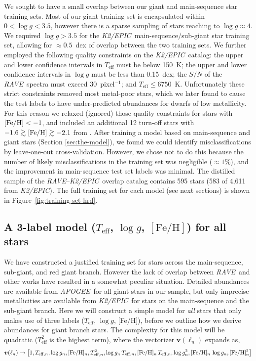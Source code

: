 \documentclass[preprint,trackchanges]{aastex}
\newcommand{\acronym}[1]{{\small{#1}}}
\newcommand{\project}[1]{\textsl{#1}}
\newcommand{\rave}{\project{\acronym{RAVE}}}
\newcommand{\apogee}{\project{\acronym{APOGEE}}}
\newcommand{\epic}{\project{K2/EPIC}}
\newcommand{\teff}{T_{\mathrm{eff}}}
\newcommand{\logg}{\log g}
\newcommand{\feh}{[\mathrm{Fe/H}]}
\newcommand{\Dvector}[1]{\boldsymbol{#1}}
\newcommand{\vecv}{\Dvector{v}}
\begin{document}
We sought to have a small overlap between our giant and main-sequence star training
sets.  Most of our giant training set is encapsulated within $0 < \logg < 3.5$, 
however there is a sparse sampling of stars reaching to $\logg \approx 4$.  We
required $\logg > 3.5$ for the \epic\ main-sequence/sub-giant star training set,
allowing for $\approx0.5$~dex of overlap between the two training sets.  We further
employed the following quality constraints on the \epic\ catalog: the upper and lower 
confidence intervals in $\teff$ must be below 150~K; the upper and lower confidence 
intervals in $\logg$ must be less than 0.15~dex; the $S/N$ of the \rave\ spectra must
exceed 30~pixel$^{-1}$; and $\teff \leqslant 6750$~K.  Unfortunately these strict 
constraints removed most metal-poor stars, which we later found to cause the test 
labels to have under-predicted abundances for dwarfs of low metallicity.  For this 
reason we relaxed (ignored) those quality constraints for stars with 
$[{\rm Fe/H}] < -1$, and included an additional 12 turn-off stars with 
$-1.6 \gtrsim [{\rm Fe/H}] \gtrsim -2.1$ from \citet{Ruchti_2011}.  After training
a model based on main-sequence and giant stars (Section \ref{sec:the-model}), we found 
we could identify misclassifications by leave-one-out cross-validation.  However, we 
chose not to do this because the number of likely misclassifications in the training
set was negligible ($\approx1$\%), and the improvement in main-sequence test set labels
was minimal.  The distilled sample of the \rave--\epic\ overlap catalog contains 595 
stars (583 of 4,611 from \epic).  The full training set for each model (see next 
sections) is shown in Figure~\ref{fig:training-set-hrd}.


\subsection{A 3-label model ($\teff$, $\logg$, $\feh$) for all stars}
\label{sec:a-simple-model}


We have constructed a justified training set for stars across the main-sequence, sub-giant,
and red giant branch.  However the lack of overlap between \rave\ and other works have
resulted in a somewhat peculiar situation.  Detailed abundances are available from \apogee\
for all giant stars in our sample, but only imprecise metallicities are available from
\epic\ for stars on the main-sequence and the sub-giant branch.  Here we will construct 
a simple model for \emph{all} stars that only makes use of three labels ($\teff$, $\logg$, 
[Fe/H]), before we outline how we derive abundances for giant branch stars.  The complexity
for this model will be quadratic ($\teff^2$ is the highest term), where the vectorizer 
$\vecv(\ell_n)$ expands as,
\begin{eqnarray}\label{eq:vectorizer-three-label}
\vecv(\ell_n) \rightarrow \left[1, T_{{\rm eff},n}, \logg_n, [{\rm Fe/H}]_n, T_{{\rm eff},n}^2, \logg_n\,T_{{\rm eff},n}, \feh_n\,T_{{\rm eff},n}, \logg_n^2, \feh_n\,\logg_n, \feh_n^2\right]
\end{eqnarray}
\end{document}
